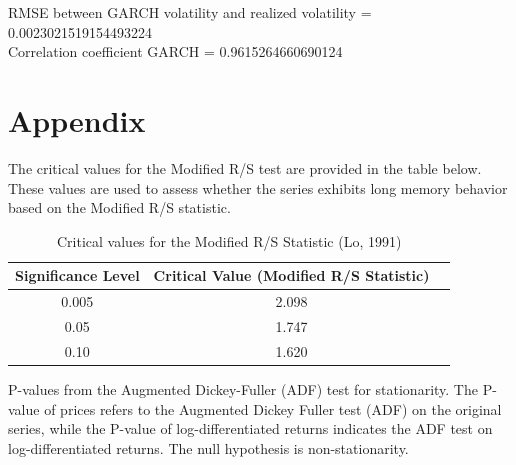 \documentclass[11pt]{extarticle}
\begin{document}
\FloatBarrier

RMSE between GARCH volatility and realized volatility = 0.0023021519154493224 \\

Correlation coefficient GARCH = 0.9615264660690124 \\

\section{Appendix}

The critical values for the Modified R/S test are provided in the table below. These values are used to assess whether the series exhibits long memory behavior based on the Modified R/S statistic.

\begin{table}[ht!]
\centering
\begin{tabular}{|c|c|c|}
\hline
\textbf{Significance Level} & \textbf{Critical Value (Modified R/S Statistic)} \\
\hline
0.005 & 2.098\\
0.05 & 1.747\\
0.10 & 1.620\\

\hline
\end{tabular}
\caption{Critical values for the Modified R/S Statistic (Lo, 1991)}
\end{table}

\begin{table}[h!]
    \centering
    \caption{P-values from the Augmented Dickey-Fuller (ADF) test for stationarity. The P-value of prices refers to the Augmented Dickey Fuller test (ADF) on the original series,
     while the P-value of log-differentiated returns indicates the ADF test on log-differentiated returns. The null hypothesis is non-stationarity.}
    \label{tab:adf_results}
\end{table}

\FloatBarrier
\end{document}
